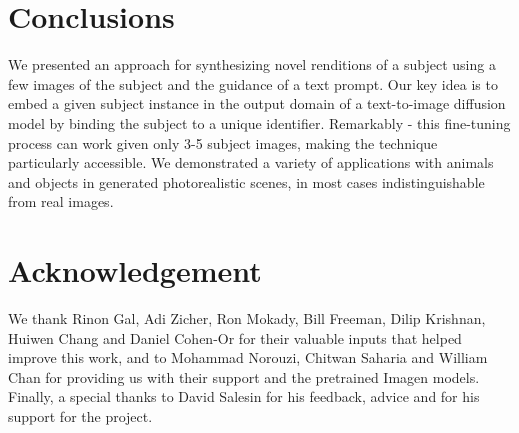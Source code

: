 \section{Conclusions}
We presented an approach for synthesizing novel renditions of a subject using a few images of the subject and the guidance of a text prompt. Our key idea is to embed a given subject instance in the output domain of a text-to-image diffusion model by binding the subject to a unique identifier.
Remarkably - this fine-tuning process can work given only 3-5 subject images, making the technique particularly accessible. 
We demonstrated a variety of applications with animals and objects in generated photorealistic scenes, in most cases indistinguishable from real images.

\section{Acknowledgement}
We thank Rinon Gal, Adi Zicher, Ron Mokady, Bill Freeman, Dilip Krishnan, Huiwen Chang and Daniel Cohen-Or for their valuable inputs that helped improve this work, and to Mohammad Norouzi, Chitwan Saharia and William Chan for providing us with their support and the pretrained Imagen models. Finally, a special thanks to David Salesin for his feedback, advice and for his support for the project.